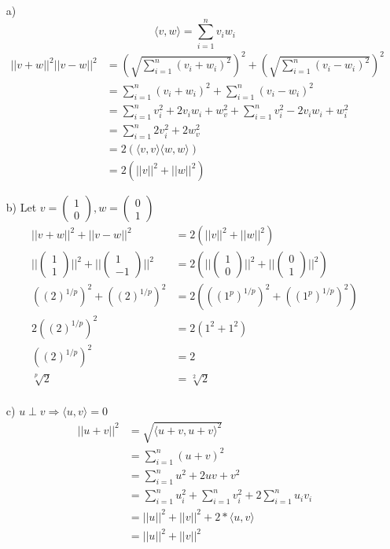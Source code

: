 \documentclass[10pt]{article}
\numberwithin{equation}{section}
\newcommand{\unita}{\begin{pmatrix} 1\\0\end{pmatrix}}
\newcommand{\unitb}{\begin{pmatrix} 0\\1\end{pmatrix}}
\begin{document}
\begin{enumerate}
\item[a)]{
$$\langle v, w \rangle = \sum_{i=1}^n v_i w_i$$
    \begin{align*}
      ||v + w||^2 ||v - w||^2 &= \left(\sqrt{\sum_{i=1}^n (v_i + w_i)^2}\right)^2 + \left(\sqrt{\sum_{i=1}^n (v_i - w_i)^2}\right)^2\\
      &= \sum_{i=1}^n (v_i + w_i)^2+ \sum_{i=1}^n (v_i - w_i)^2\\
      &= \sum_{i=1}^n v_i^2 +2v_i w_i + w_v^2 + \sum_{i=1}^n v_i^2 -2v_i w_i  + w_i^2\\
      &= \sum_{i=1}^n 2v_i^2 + 2w_v^2 \\
      &= 2 (\langle v,v \rangle \langle w,w \rangle)\\
      &= 2 (||v||^2 + ||w||^2)
    \end{align*}
  }
\item[b)]{
    Let $v = \unita, w = \unitb$
    \begin{align*}
      || v+w||^2  + || v-w||^2 &= 2(||v||^2 +||w||^2)\\
      || \begin{pmatrix}1\\1\end{pmatrix}||^2  + || \begin{pmatrix}1\\-1\end{pmatrix}||^2 &= 2\left(||\unita||^2 +||\unitb||^2\right)\\
      ((2)^{1/p})^2 + ((2)^{1/p})^2 &= 2\left( ((1^p)^{1/p})^2 + ((1^p)^{1/p})^2\right)\\
      2((2)^{1/p})^2 &= 2( 1^2 + 1^2)\\
      ((2)^{1/p})^2 &= 2\\
      \sqrt[p]{2} &= \sqrt[2]{2}\\
    \end{align*}
  }
\item[c)]{
    $u \perp v \Rightarrow \langle u,v \rangle = 0$
    \begin{align*}
      || u + v ||^2 &= \sqrt{\langle u+v, u+v\rangle^2 }\\
                    &= \sum_{i=1}^n (u+v)^2\\
                    &= \sum_{i=1}^n u^2 + 2uv + v^2\\
                    &= \sum_{i=1}^n u_i^2 + \sum_{i=1}^n v_i^2 + 2\sum_{i=1}^n u_i v_i\\
                    &= ||u||^2 + ||v||^2 + 2*\langle u,v \rangle\\
                    &= ||u||^2 + ||v||^2 
    \end{align*}
  }
\end{enumerate}
\end{document}
